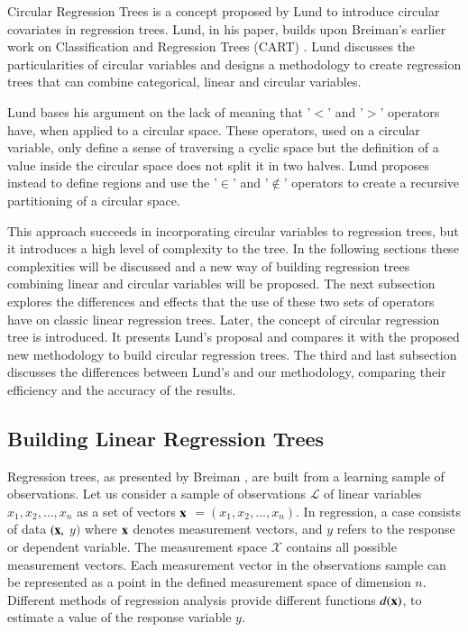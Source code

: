 \documentclass[times,twocolumn,final,authoryear]{elsarticle}
\begin{document}
Circular Regression Trees is a concept proposed by Lund \citep{Lund2002} to introduce circular covariates in regression trees. Lund, in his paper, builds upon Breiman's earlier work on Classification and Regression Trees (CART) \citep{Breimanetal1984}. Lund discusses the particularities of circular variables and designs a methodology to create regression trees that can combine categorical, linear and circular variables.

Lund bases his argument on the lack of meaning that '$<$' and '$>$' operators have, when applied to a circular space. These operators, used on a circular variable, only define a sense of traversing a cyclic space but the definition of a value inside the circular space does not split it in two halves. Lund proposes instead to define regions and use the '$\in$' and '$\notin$' operators to create a recursive partitioning of a circular space. 

This approach succeeds in incorporating circular variables to regression trees, but it introduces a high level of complexity to the tree. In the following sections these complexities will be discussed and a new way of building regression trees combining linear and circular variables will be proposed. The next subsection explores the differences and effects that the use of these two sets of operators have on classic linear regression trees. Later, the concept of circular regression tree is introduced. It presents Lund's proposal and compares it with the proposed new methodology to build circular regression trees. The third and last subsection discusses the differences between Lund's and our methodology, comparing their efficiency and the accuracy of the results.

\subsection{Building Linear Regression Trees}

Regression trees, as presented by Breiman \citep{Breimanetal1984}, are built from a learning sample of observations. Let us consider a sample of observations $\mathcal{L}$ of linear variables $ x_1, x_2, \dots, x_n $ as a set of vectors $\bf{x} $ $= (x_1, x_2, \dots, x_n)$. In regression, a case consists of data $(\bf{x},$ $y)$ where $\bf{x}$ denotes measurement vectors, and $ y $ refers to the response or dependent variable. The measurement space $\mathcal{X}$ contains all possible measurement vectors. Each measurement vector in the observations sample can be represented as a point in the defined measurement space of dimension $n$. Different methods of regression analysis provide different functions $d(\bf{x})$, to estimate a value of the response variable $y$.
\end{document}
